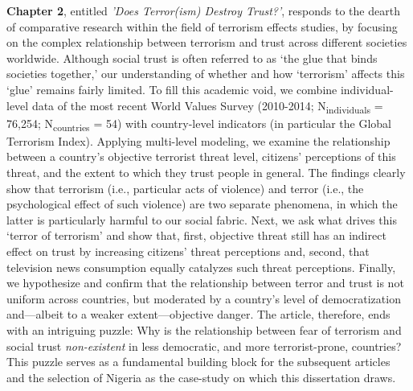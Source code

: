 \textbf{Chapter 2}, entitled \textit{'Does Terror(ism) Destroy Trust?'}, responds to the dearth of comparative research within the field of terrorism effects studies, by focusing on the complex relationship between terrorism and trust across different societies worldwide. Although social trust is often referred to as `the glue that binds societies together,' our understanding of whether and how `terrorism' affects this `glue' remains fairly limited. To fill this academic void, we combine individual-level data of the most recent World Values Survey (2010-2014; N\textsubscript{individuals} = 76,254; N\textsubscript{countries} = 54) with country-level indicators (in particular the Global Terrorism Index). Applying multi-level modeling, we examine the relationship between a country's objective terrorist threat level, citizens' perceptions of this threat, and the extent to which they trust people in general. The findings clearly show that terrorism (i.e., particular acts of violence) and terror (i.e., the psychological effect of such violence) are two separate phenomena, in which the latter is particularly harmful to our social fabric. Next, we ask what drives this `terror of terrorism' and show that, first, objective threat still has an indirect effect on trust by increasing citizens' threat perceptions and, second, that television news consumption equally catalyzes such threat perceptions. Finally, we hypothesize and confirm that the relationship between terror and trust is not uniform across countries, but moderated by a country's level of democratization and---albeit to a weaker extent---objective danger. The article, therefore, ends with an intriguing puzzle: Why is the relationship between fear of terrorism and social trust \textit{non-existent} in less democratic, and more terrorist-prone, countries? This puzzle serves as a fundamental building block for the subsequent articles and the selection of Nigeria as the case-study on which this dissertation draws.


